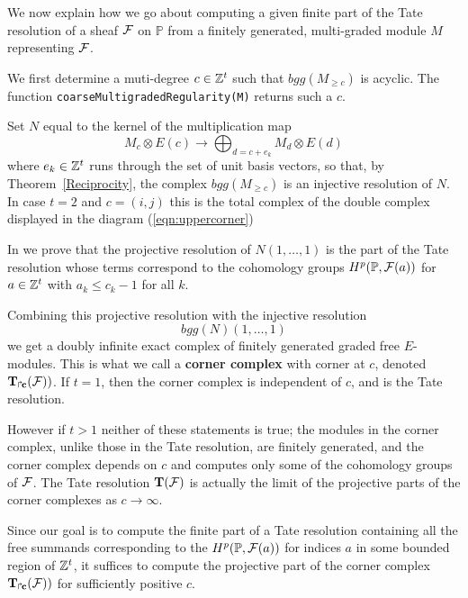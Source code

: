 \documentclass[twoside,12pt, leqno]{amsart}
\def\PP{{\mathbb P}}
\def\cornerT#1{{T_{\Rsh \kern -1pt #1}}}
\def\bT{{\bf T}}
\begin{document}
We now explain how we go about computing a given finite part of the Tate resolution
of a sheaf ${\mathcal F}$ on $\PP$ from a finitely generated, multi-graded module $M$
representing ${\mathcal F}$.

We first determine a muti-degree $c \in {\mathbb Z}^t$ such that $bgg(M_{ \ge c})$ is acyclic.
The function {\tt coarseMultigradedRegularity(M)} returns such a $c$.

Set $N$ equal to the kernel of the multiplication map
$$ 
M_c \otimes E(c) \to \bigoplus_{d=c+e_k}M_{d} \otimes E(d) 
$$
where $e_k \in {\mathbb Z}^t$ runs through the set of unit basis vectors,
so that, by Theorem~\ref{Reciprocity}, the complex $bgg(M_{\ge c})$ is an injective resolution of $N$.
In case $t=2$ and $c=(i,j)$ this is the total complex of the double complex displayed in the diagram (\ref{eqn:uppercorner})
 
In \cite{EES} we prove that
the projective resolution of $N(1,\ldots,1)$ is the part of the Tate resolution whose terms correspond to the cohomology groups
$H^p(\PP, \sF(a))$ for  $a \in {\mathbb Z}^t$ with $a_k\le c_k -1$ for all $k$. 

Combining this projective resolution  
 with the injective resolution 
 $$
 bgg(N)(1,\ldots,1)
 $$
   we get a doubly infinite exact complex of finitely generated graded free $E$-modules.
This is what we call a {\bf corner complex} with corner at $c$, denoted
${\bf \cornerT c} (\sF))$. If $t=1$, then the corner complex
is independent of $c$, and is the Tate resolution. 

However if $t>1$ neither of these statements is true; the modules in the corner complex, unlike those in the Tate resolution, are finitely generated, and the corner complex depends  on $c$ and computes only
some of the cohomology groups of ${\mathcal F}$. The Tate resolution  $\bT(\sF)$ is actually 
 the limit of the projective parts of the corner complexes as  $c \to \infty$.
 
 Since our goal is to compute the finite part of a Tate resolution containing all the free summands corresponding to the $H^p(\PP, \sF(a))$ for  indices $a$ in some bounded region of ${\mathbb Z}^t$, 
it suffices to compute the projective part of the corner complex ${\bf \cornerT c} (\sF))$ for sufficiently
positive $c$.
\end{document}
